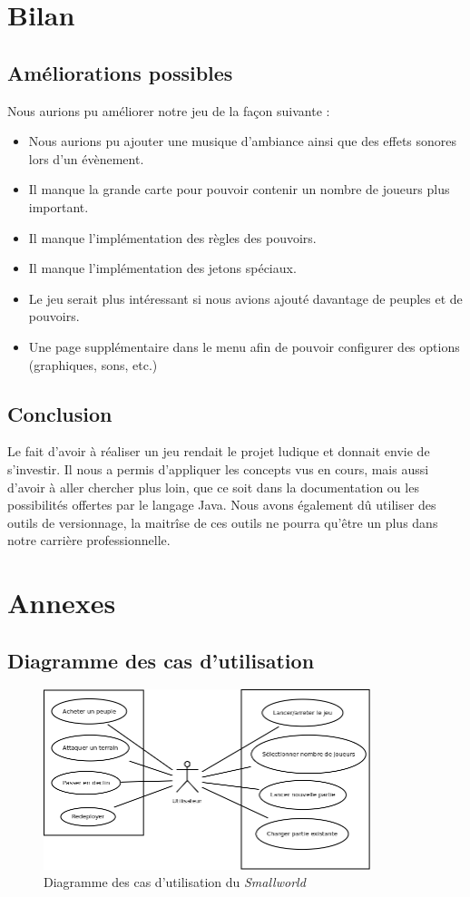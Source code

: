 \documentclass[a4paper]{report}
\begin{document}
\chapter{Bilan}
\section{Améliorations possibles}
\par
Nous aurions pu améliorer notre jeu de la façon suivante :
\begin{itemize}
\item Nous aurions pu ajouter une musique d'ambiance ainsi que des effets sonores lors d'un évènement.
\item Il manque la grande carte pour pouvoir contenir un nombre de joueurs plus important.
\item Il manque l'implémentation des règles des pouvoirs.
\item Il manque l'implémentation des jetons spéciaux.
\item Le jeu serait plus intéressant si nous avions ajouté davantage de peuples et de pouvoirs.
\item Une page supplémentaire dans le menu afin de pouvoir configurer des options (graphiques, sons, etc.)
\end{itemize}
\section{Conclusion}
\par
Le fait d'avoir à réaliser un jeu rendait le projet ludique et donnait envie de s'investir. Il nous a permis d'appliquer les concepts vus en cours, mais aussi d'avoir à aller chercher plus loin, que ce soit dans la documentation ou les possibilités offertes par le langage Java. Nous avons également dû utiliser des outils de versionnage, la maitrîse de ces outils ne pourra qu'être un plus dans notre carrière professionnelle.

\newpage
\chapter{Annexes}
\section{Diagramme des cas d'utilisation}
\begin{figure}[H]
    \begin{center}
        \includegraphics[width=0.85\textwidth]{use_case.png}
        \caption{Diagramme des cas d'utilisation du \textit{Smallworld}}
    \end{center}
\end{figure}
\end{document}
